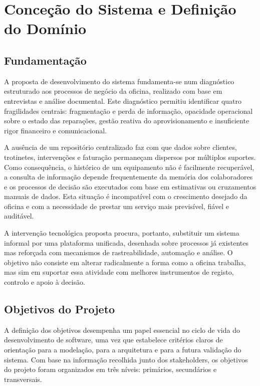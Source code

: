 \documentclass[a4paper,12pt]{scrreprt}
\begin{document}



\chapter{Conceção do Sistema e Definição do Domínio}

    \section{Fundamentação}
        A proposta de desenvolvimento do sistema fundamenta-se num diagnóstico estruturado aos processos de negócio da oficina, realizado com base em entrevistas e análise documental. Este diagnóstico permitiu identificar quatro fragilidades centrais: fragmentação e perda de informação, opacidade operacional sobre o estado das reparações, gestão reativa do aprovisionamento e insuficiente rigor financeiro e comunicacional.

        A ausência de um repositório centralizado faz com que dados sobre clientes, trotinetes, intervenções e faturação permaneçam dispersos por múltiplos suportes. Como consequência, o histórico de um equipamento não é facilmente recuperável, a consulta de informação depende frequentemente da memória dos colaboradores e os processos de decisão são executados com base em estimativas ou cruzamentos manuais de dados. Esta situação é incompatível com o crescimento desejado da oficina e com a necessidade de prestar um serviço mais previsível, fiável e auditável.

        A intervenção tecnológica proposta procura, portanto, substituir um sistema informal por uma plataforma unificada, desenhada sobre processos já existentes mas reforçada com mecanismos de rastreabilidade, automação e análise. O objetivo não consiste em alterar radicalmente a forma como a oficina trabalha, mas sim em suportar essa atividade com melhores instrumentos de registo, controlo e apoio à decisão.

    \section{Objetivos do Projeto}
        A definição dos objetivos desempenha um papel essencial no ciclo de vida do desenvolvimento de software, uma vez que estabelece critérios claros de orientação para a modelação, para a arquitetura e para a futura validação do sistema. Com base na informação recolhida junto dos stakeholders, os objetivos do projeto foram organizados em três níveis: primários, secundários e transversais.
\end{document}
